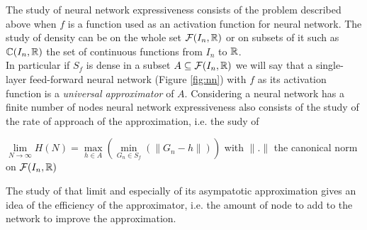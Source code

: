 \documentclass[12pt, a4paper]{article}
\begin{document}
The study of neural network expressiveness consists of the problem described above when $f$ is a function used as an activation function for neural network. The study of density can be on the whole set $\mathcal{F}(I_n,\mathbb{R})$ or on subsets of it such as $\mathbb{C}(I_n,\mathbb{R})$ the set of continuous functions from $I_n$ to $\mathbb{R}$.\\

In particular if $S_f$ is dense in a subset $A \subseteq \mathcal{F}(I_n, \mathbb{R})$ we will say that a single-layer feed-forward neural network (Figure \ref{fig:nn}) with $f$ as its activation function is a \textit{universal approximator} of $A$. Considering a neural network has a finite number of nodes neural network expressiveness also consists of the study of the rate of approach of the approximation, i.e. the sudy of \\

\begin{center}
  $\lim\limits_{N \to \infty} H(N) = \max\limits_{h\in A} (\min\limits_{G_n \in S_f} (\parallel G_n - h \parallel))$ with $\parallel . \parallel$ the canonical norm on $\mathcal{F}(I_n, \mathbb{R})$
\end{center}

The study of that limit and especially of its asympatotic approximation gives an idea of the efficiency of the approximator, i.e. the amount of node to add to the network to improve the approximation.\\
\end{document}
